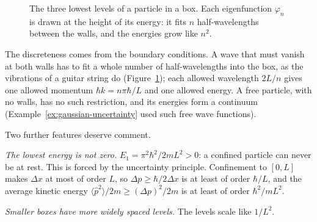 \begin{figure}[htb]
  \centering
  \caption{The three lowest levels of a particle in a box. Each eigenfunction $\varphi_n$ is drawn at the height of its energy: it fits $n$ half-wavelengths between the walls, and the energies grow like $n^2$.}
  \label{fig:box}
\end{figure}

The discreteness comes from the boundary conditions. A wave that must vanish at both walls has to fit a whole number of half-wavelengths into the box, as the vibrations of a guitar string do (Figure~\ref{fig:box}); each allowed wavelength $2L/n$ gives one allowed momentum $\hbar k=n\pi\hbar/L$ and one allowed energy. A free particle, with no walls, has no such restriction, and its energies form a continuum (Example~\ref{ex:gaussian-uncertainty} used such free wave functions).

Two further features deserve comment.
\begin{steps}
  \item \emph{The lowest energy is not zero.} $E_1=\pi^2\hbar^2/2mL^2>0$: a confined particle can never be at rest. This  is forced by the uncertainty principle. Confinement to $[0,L]$ makes $\Delta x$ at most of order $L$, so $\Delta p\ge\hbar/2\Delta x$ is at least of order $\hbar/L$, and the average kinetic energy $\langle\hat p^2\rangle/2m\ge(\Delta p)^2/2m$ is at least of order $\hbar^2/mL^2$.
  \item \emph{Smaller boxes have more widely spaced levels.} The levels scale like $1/L^2$.
\end{steps}

